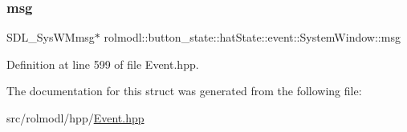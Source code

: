 \subsubsection{\texorpdfstring{msg}{msg}}
{\footnotesize\ttfamily S\+D\+L\+\_\+\+Sys\+W\+Mmsg$\ast$ rolmodl\+::button\+\_\+state\+::hat\+State\+::event\+::\+System\+Window\+::msg}



Definition at line 599 of file Event.\+hpp.



The documentation for this struct was generated from the following file\+:\begin{DoxyCompactItemize}
\item 
src/rolmodl/hpp/\mbox{\hyperlink{_event_8hpp}{Event.\+hpp}}\end{DoxyCompactItemize}
